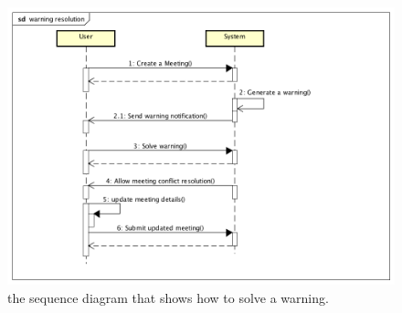 \begin{figure}[htp]

	\centering
	\includegraphics[width=\textwidth]{"sequencediagrams/ warningresolution"}
	\caption{the sequence diagram that shows how to solve a warning.}
	\label{fig:-warningresolution}
	\begin{center}

	\end{center}
\end{figure}
\newpage


